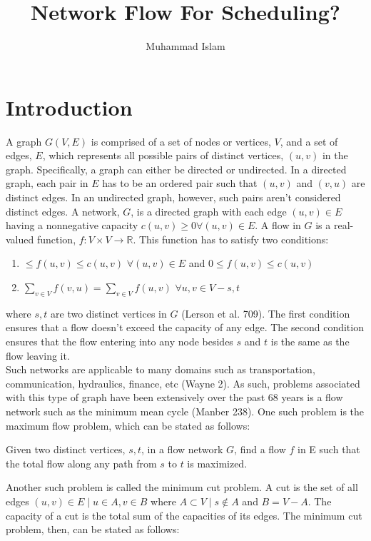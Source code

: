 \documentclass[11pt]{article}
\title{Network Flow For Scheduling?}
\author{Muhammad Islam}
\begin{document}
\maketitle
\section{Introduction}
A graph $G(V,E)$ is comprised of a set of nodes or vertices, $V$, and a set of edges, $E$, which represents all possible pairs of distinct vertices, $(u, v)$ in the graph. Specifically, a graph can either be directed or undirected. In a directed graph, each pair in $E$ has to be an ordered pair such that $(u,v)$ and $(v, u)$ are distinct edges. In an undirected graph, however, such pairs aren't considered distinct edges. A network, $G$, is a directed graph with each edge $(u, v) \in E$ having a nonnegative capacity $c(u, v) \geq 0 \forall (u, v) \in E$. A flow in $G$ is a real-valued function, $f: V \times V \rightarrow \mathbb{R}$. This function has to satisfy two conditions:
\begin{enumerate}
\item $\leq f(u, v) \leq c(u,v)$  $\forall (u, v) \in E$ and $0 \leq f(u, v) \leq c(u,v)$  
\item $\sum_{v \in V} f(v, u) = \sum_{v \in V} f(u, v)$ $\forall u, v \in V - {s, t}$
\end{enumerate}
where $s, t$ are two distinct vertices in $G$ (Lerson et al. 709). The first condition ensures that a flow doesn't exceed the capacity of any edge. The second condition ensures that the flow entering into any node besides $s$ and $t$ is the same as the flow leaving it. \\
Such networks are applicable to many domains such as transportation, communication, hydraulics, finance, etc (Wayne 2). As such, problems associated with this type of graph have been extensively over the past 68 years is a flow network such as the minimum mean cycle  (Manber 238). One such problem is the maximum flow problem, which can be stated as follows:
\begin{tcolorbox}
	Given two distinct vertices, $s, t$, in a flow network $G$, find a flow $f$ in E such that the total flow along any path from $s$ to $t$ is maximized.  
\end{tcolorbox}
Another such problem is called the minimum cut problem. A cut is the set of all edges $(u, v) \in E \mid u \in A, v \in B$ where $A \subset V \mid s \not\in A$ and $B = V - A$. The capacity of a cut is the total sum of the capacities of its edges. The minimum cut problem, then, can be stated as follows:
\end{document}
